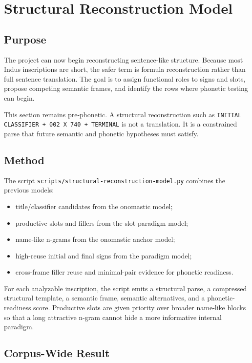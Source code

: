 \section{Structural Reconstruction Model}

\subsection{Purpose}

The project can now begin reconstructing sentence-like structure. Because most Indus inscriptions are short, the safer term is formula reconstruction rather than full sentence translation. The goal is to assign functional roles to signs and slots, propose competing semantic frames, and identify the rows where phonetic testing can begin.

This section remains pre-phonetic. A structural reconstruction such as \texttt{INITIAL CLASSIFIER + 002 X 740 + TERMINAL} is not a translation. It is a constrained parse that future semantic and phonetic hypotheses must satisfy.

\subsection{Method}

The script \texttt{scripts/structural-reconstruction-model.py} combines the previous models:

\begin{itemize}
  \item title/classifier candidates from the onomastic model;
  \item productive slots and fillers from the slot-paradigm model;
  \item name-like n-grams from the onomastic anchor model;
  \item high-reuse initial and final signs from the paradigm model;
  \item cross-frame filler reuse and minimal-pair evidence for phonetic readiness.
\end{itemize}

For each analyzable inscription, the script emits a structural parse, a compressed structural template, a semantic frame, semantic alternatives, and a phonetic-readiness score. Productive slots are given priority over broader name-like blocks so that a long attractive n-gram cannot hide a more informative internal paradigm.

\subsection{Corpus-Wide Result}

